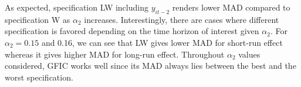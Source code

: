 As expected, specification LW including $y_{it-2}$ renders lower MAD compared to specification W as $\alpha_2$ increases. Interestingly, there are cases where different specification is favored depending on the time horizon of interest given $\alpha_2$. For $\alpha_2 = 0.15$ and 0.16, we can see that LW gives lower MAD for short-run effect whereas it gives higher MAD for long-run effect. Throughout $\alpha_2$ values considered, GFIC works well since its MAD always lies between the best and the worst specification. 


